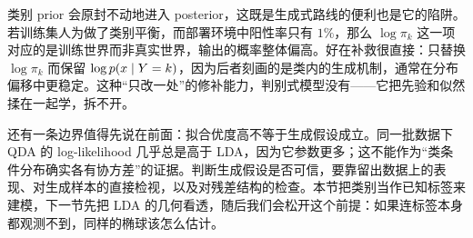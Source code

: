 类别 prior 会原封不动地进入 posterior，这既是生成式路线的便利也是它的陷阱。若训练集人为做了类别平衡，而部署环境中阳性率只有 \(1\%\)，那么 \(\log\pi_k\) 这一项对应的是训练世界而非真实世界，输出的概率整体偏高。好在补救很直接：只替换 \(\log\pi_k\) 而保留 \(\log p(x\mid Y=k)\)，因为后者刻画的是类内的生成机制，通常在分布偏移中更稳定。这种``只改一处''的修补能力，判别式模型没有——它把先验和似然揉在一起学，拆不开。

还有一条边界值得先说在前面：拟合优度高不等于生成假设成立。同一批数据下 QDA 的 log-likelihood 几乎总是高于 LDA，因为它参数更多；这不能作为``类条件分布确实各有协方差''的证据。判断生成假设是否可信，要靠留出数据上的表现、对生成样本的直接检视，以及对残差结构的检查。本节把类别当作已知标签来建模，下一节先把 LDA 的几何看透，随后我们会松开这个前提：如果连标签本身都观测不到，同样的椭球该怎么估计。

